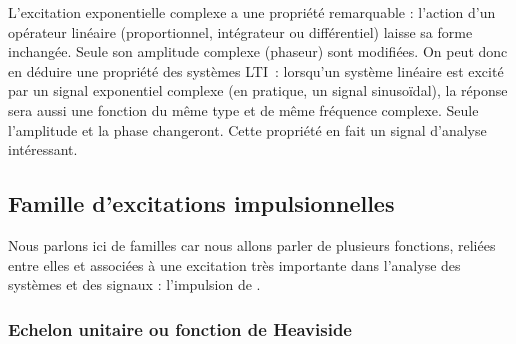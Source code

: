 	
      L'excitation exponentielle complexe a une propriété remarquable
      : l'action d'un opérateur linéaire (proportionnel, intégrateur
      ou différentiel) laisse sa forme inchangée. Seule son amplitude
      complexe (phaseur) sont modifiées. On peut donc en déduire une
      propriété des systèmes LTI~: lorsqu'un système linéaire est
      excité par un signal exponentiel complexe (en pratique, un
      signal sinusoïdal), la réponse sera aussi une fonction du même
      type et de même fréquence complexe. Seule l'amplitude et la
      phase changeront. Cette propriété en fait un signal d'analyse
      intéressant.
	
      \subsection{Famille d'excitations impulsionnelles}
	
	Nous parlons ici de familles car nous allons parler de
        plusieurs fonctions, reliées entre elles et associées à une
        excitation très importante dans l'analyse des systèmes et des
        signaux : l'impulsion de \Dirac.
	
	\subsubsection{Echelon unitaire ou fonction de Heaviside}

